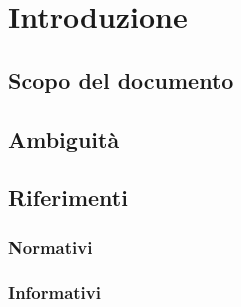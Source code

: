 \section{Introduzione}
	\subsection{Scopo del documento}
	\subsection{Ambiguità}
	\subsection{Riferimenti}
		\subsubsection{Normativi}
		\subsubsection{Informativi}


